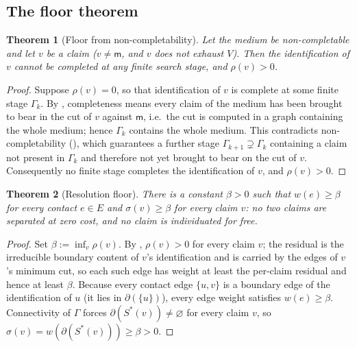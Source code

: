 \documentclass[11pt,twocolumn,a4paper]{article}
\theoremstyle{thmstyle}
\newtheorem{theorem}{Theorem}[section]
\theoremstyle{definition}
\theoremstyle{remark}
\newcommand{\Gph}{\Gamma}
\newcommand{\V}{V}
\newcommand{\E}{E}
\newcommand{\wt}{w}
\newcommand{\med}{\mathsf{m}}
\newcommand{\flo}{\beta}
\newcommand{\cut}{\partial}
\newcommand{\res}{\rho}
\newcommand{\str}{\sigma}
\begin{document}
\subsection{The floor theorem}

\begin{theorem}[Floor from non-completability]
\label{thm:floor-derived}
Let the medium be non-completable and let $v$ be a claim ($v\neq\med$, and
$v$ does not exhaust $\V$). Then the identification of $v$ cannot be
completed at any finite search stage, and $\res(v)>0$.
\end{theorem}

\begin{proof}
Suppose $\res(v)=0$, so that identification of $v$ is complete at some
finite stage $\Gph_k$. By , completeness means
every claim of the medium has been brought to bear in the cut of $v$
against $\med$, i.e.\ the cut is computed in a graph containing the whole
medium; hence $\Gph_k$ contains the whole medium. This contradicts
non-completability (), which guarantees a further
stage $\Gph_{k+1}\supsetneq\Gph_k$ containing a claim not present in
$\Gph_k$ and therefore not yet brought to bear on the cut of $v$.
Consequently no finite stage completes the identification of $v$, and
$\res(v)>0$.
\end{proof}

\begin{theorem}[Resolution floor]
\label{thm:floor}
There is a constant $\flo>0$ such that $\wt(e)\ge\flo$ for every contact
$e\in\E$ and $\str(v)\ge\flo$ for every claim $v$: no two claims are
separated at zero cost, and no claim is individuated for free.
\end{theorem}

\begin{proof}
Set $\flo:=\inf_v\res(v)$. By , $\res(v)>0$ for
every claim $v$; the residual is the irreducible boundary content of $v$'s
identification and is carried by the edges of $v$'s minimum cut, so each
such edge has weight at least the per-claim residual and hence at least
$\flo$. Because every contact edge $\{u,v\}$ is a boundary edge of the
identification of $u$ (it lies in $\cut(\{u\})$), every edge weight
satisfies $\wt(e)\ge\flo$. Connectivity of $\Gph$ forces
$\cut(S^{\ast}(v))\neq\varnothing$ for every claim $v$, so
$\str(v)=\wt(\cut(S^{\ast}(v)))\ge\flo>0$.
\end{proof}
\end{document}

